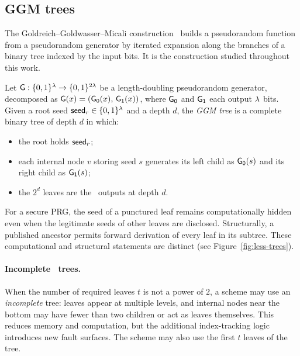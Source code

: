 \subsection{GGM trees}
The Goldreich--Goldwasser--Micali construction~\cite{GGM86} builds a
pseudorandom function from a pseudorandom generator by iterated expansion along
the branches of a binary tree indexed by the input bits. It is the construction
studied throughout this work.

\begin{definition}
\label{def:ggm}
Let $\mathsf{G} : \{0,1\}^{\lambda} \to \{0,1\}^{2\lambda}$ be a length-doubling pseudorandom
generator, decomposed as $\mathsf{G}(x) = (\mathsf{G_0}(x),\, \mathsf{G_1}(x))$, where $\mathsf{G_0}$ and
$\mathsf{G_1}$ each output $\lambda$ bits.  Given a root seed
$\mathsf{seed}_r \in \{0,1\}^{\lambda}$ and a depth $d$, the \emph{GGM tree} is a complete
binary tree of depth $d$ in which:
\begin{itemize}
  \item the root holds $\mathsf{seed}_r$;
  \item each internal node $v$ storing seed $s$ generates its left child as
        $\mathsf{G_0}(s)$ and its right child as $\mathsf{G_1}(s)$;
  \item the $2^{d}$ leaves are the \PRG\ outputs at depth $d$.
\end{itemize}
\end{definition}

For a secure PRG, the seed of a punctured leaf remains computationally
hidden even when the legitimate seeds of other leaves are disclosed.
Structurally, a published ancestor permits forward derivation of every leaf
in its subtree. These computational and structural statements are distinct
(see Figure~\ref{fig:less-trees}).

\paragraph{Incomplete \GGM\ trees.}
When the number of required leaves $t$ is not a power of $2$, a scheme may use an
\emph{incomplete} tree: leaves appear at multiple levels, and internal nodes near
the bottom may have fewer than two children or act as leaves themselves. This
reduces memory and computation, but the additional index-tracking logic introduces
new fault surfaces. The scheme may also use the first $t$ leaves of the tree.

